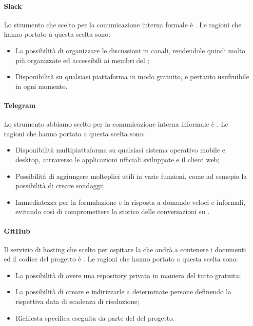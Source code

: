 \paragraph{Slack}
Lo strumento che scelto per la comunicazione interna formale è .
Le ragioni che hanno portato a questa scelta sono:
\begin{itemize}
\item La possibilità di organizzare le discussioni in canali, rendendole quindi molto più organizzate ed accessibili ai membri del ;
\item Disponibilità su qualsiasi piattaforma in modo gratuito, e pertanto usufruibile in ogni momento.
\end{itemize}

\paragraph{Telegram}
Lo strumento abbiamo scelto per la comunicazione interna informale è .
Le ragioni che hanno portato a questa scelta sono:
\begin{itemize}
\item Disponibilità multipiattaforma su qualsiasi sistema operativo mobile e desktop, attraverso le applicazioni ufficiali sviluppate e il client web;
\item Possibilità di aggiungere molteplici  utili in varie funzioni, come ad esmepio la possibilità di creare sondaggi;
\item Immediatezza per la formulazione e la risposta a domande veloci e informali, evitando così di compromettere lo storico delle conversazioni su .
\end{itemize}

\paragraph{GitHub}
Il servizio di hosting che scelto per ospitare la  che andrà a contenere i documenti ed il codice del progetto è .
Le ragioni che hanno portato a questa scelta sono:
\begin{itemize}
\item La possibilità di avere una repository privata in maniera del tutto gratuita; 
\item La possibilità di creare  e indirizzarle a determinate persone definendo la rispettiva data di scadenza di risoluzione;
\item Richiesta specifica eseguita da parte del  del progetto.
\end{itemize}

